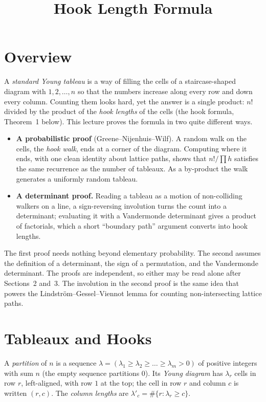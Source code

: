 \documentclass[11pt]{article}
\title{Hook Length Formula}
\author{}
\date{}
\begin{document}
\thispagestyle{fancy}


\section{Overview}
A \emph{standard Young tableau} is a way of filling the cells of a staircase-shaped diagram with $1,2,\dots,n$ so that the numbers increase along every row and down every column.
Counting them looks hard, yet the answer is a single product: $n!$ divided by the product of the \emph{hook lengths} of the cells (the hook formula, Theorem~1 below).
This lecture proves the formula in two quite different ways.
\begin{itemize}[leftmargin=1.5em]
  \item \textbf{A probabilistic proof} (Greene--Nijenhuis--Wilf). A random walk on the cells, the \emph{hook walk}, ends at a corner of the diagram. Computing where it ends, with one clean
        identity about lattice paths, shows that $n!/\prod h$ satisfies the same recurrence as the number of tableaux. As a by-product the walk generates a uniformly random tableau.
  \item \textbf{A determinant proof.} Reading a tableau as a motion of non-colliding walkers on a line, a sign-reversing involution turns the count into a determinant; evaluating it
        with a Vandermonde determinant gives a product of factorials, which a short ``boundary path'' argument converts into hook lengths.
\end{itemize}
The first proof needs nothing beyond elementary probability. The second assumes the definition of a determinant, the sign of a permutation, and the Vandermonde determinant.
The proofs are independent, so either may be read alone after Sections~2 and~3. The involution in the second proof is the same idea that powers the Lindstr\"om--Gessel--Viennot lemma for counting
non-intersecting lattice paths.

\section{Tableaux and Hooks}
\begin{definitionbox}
A \emph{partition} of $n$ is a sequence $\lambda=(\lambda_1\ge\lambda_2\ge\dots\ge\lambda_m>0)$ of positive integers with sum $n$ (the empty sequence partitions $0$).
Its \emph{Young diagram} has $\lambda_r$ cells in row $r$, left-aligned, with row $1$ at the top; the cell in row $r$ and column $c$ is written $(r,c)$.
The \emph{column lengths} are $\lambda'_c=\#\{r:\lambda_r\ge c\}$.
\end{definitionbox}
\end{document}
